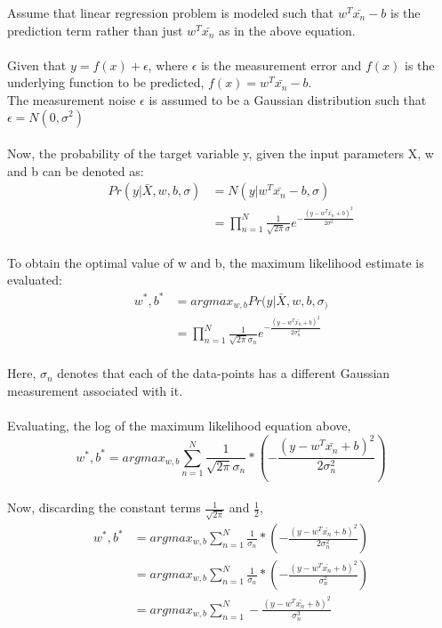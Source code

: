 \documentclass[a4paper]{article}
\begin{document}
Assume that linear regression problem is modeled such that $w^T\bar{x_n} - b$ is the prediction term rather than just $w^T\bar{x_n}$ as in the above equation.\\\\
Given that $y = f(x) + \epsilon$, where $\epsilon$ is the measurement error and $f(x)$ is the underlying function to be predicted, $f(x) = w^T\bar{x_n} - b$.\\
The measurement noise $\epsilon$ is assumed to be a Gaussian distribution such that $\epsilon = N(0, \sigma^2)$\\\\
Now, the probability of the target variable y, given the input parameters X, w and b can be denoted as: \\
\begin{align*}
	Pr(y|\bar{X},w,b,\sigma) &= N(y|w^T\bar{x_n} - b,\sigma)\\
	&= \prod_{n=1}^{N} \frac{1}{\sqrt{2\pi}\sigma} e ^{-\frac{(y - w^T\bar{x_n} + b)^2}{2\sigma^2}}
\end{align*}
\\
To obtain the optimal value of w and b, the maximum likelihood estimate is evaluated:
\begin{align*}
	w^*, b^* &= argmax_{w,b} Pr(y|\bar{X},w,b,\sigma_)\\
	&= \prod_{n=1}^{N} \frac{1}{\sqrt{2\pi}\sigma_n} e ^{-\frac{(y - w^T\bar{x_n} + b)^2}{2\sigma_n^2}}
\end{align*}
\\
Here, $\sigma_n$ denotes that each of the data-points has a different Gaussian measurement associated with it. 
\\
\\
Evaluating, the log of the maximum likelihood equation above,
\\
$$w^*, b^* = argmax_{w,b} \sum_{n=1}^{N} \frac{1}{\sqrt{2\pi}\sigma_n} * (-\frac{(y - w^T\bar{x_n} + b)^2}{2\sigma_n^2})$$
\\
Now, discarding the constant terms $\frac{1}{\sqrt{2\pi}}$ and $\frac{1}{2}$,
\\
\begin{align*}
	w^*, b^* &= argmax_{w,b} \sum_{n=1}^{N} \frac{1}{\sigma_n} * (-\frac{(y - w^T\bar{x_n} + b)^2}{2\sigma_n^2})\\
	&= argmax_{w,b} \sum_{n=1}^{N} \frac{1}{\sigma_n} * (-\frac{(y - w^T\bar{x_n} + b)^2}{\sigma_n^2})\\
	&= argmax_{w,b} \sum_{n=1}^{N} -\frac{(y - w^T\bar{x_n} + b)^2}{\sigma_n^3}\\
\end{align*}
\end{document}
